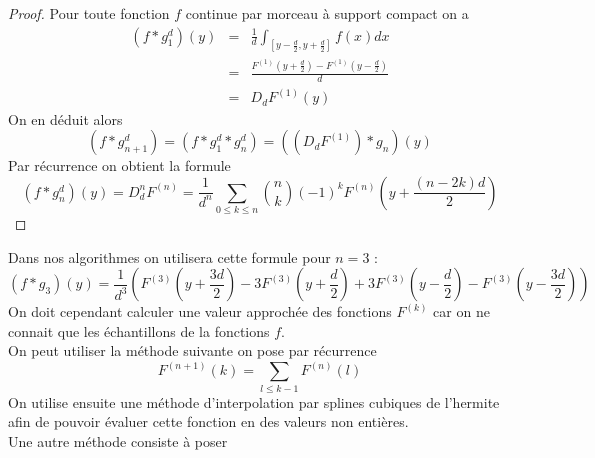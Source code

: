 \begin{proof}
Pour toute fonction $f$ continue par morceau à support compact on a 
\begin{eqnarray*}
(f * g_1^d )(y)&=&\frac{1}{d} \int_{[y-\frac{d}{2},y+\frac{d}{2}]} f(x) dx\\
               &=&\frac{F^{(1)}(y+\frac{d}{2})-F^{(1)}(y-\frac{d}{2})}{d}\\
               &=&D_d F^{(1)}(y)
\end{eqnarray*}
On en déduit alors 
\begin{equation*}
(f*g_{n+1}^{d})=(f*g_1^d * g_{n}^{d})= ((D_d F^{(1)})*g_n )(y)
\end{equation*}
Par récurrence on obtient la formule 
\begin{equation*}
(f*g_n^d)(y)=D_d ^n F^{(n)}= \frac{1}{d^n}\underset{0 \le k\le n}{\sum} \binom{n}{k}(-1)^{k} F^{(n)}(y+\frac{(n-2k)d}{2})
\end{equation*}

\end{proof}
Dans nos algorithmes  on utilisera cette formule pour $n=3$ :
\begin{equation*}
(f*g_3)(y)=\frac{1}{d^3}(F^{(3)}(y+\frac{3d}{2})-3F^{(3)}(y+\frac{d}{2})+3F^{(3)}(y-\frac{d}{2})-F^{(3)}(y-\frac{3d}{2}))
\end{equation*}
On doit cependant calculer une valeur approchée des fonctions $F^{(k)}$  car on ne connait que les échantillons de la fonctions $f$.\\
On peut utiliser la méthode suivante on pose par récurrence
\begin{equation*}
F^{(n+1)}(k)=\underset{l\le k-1}{\sum}F^{(n)}(l)
\end{equation*}
On utilise ensuite une méthode d'interpolation par splines cubiques de l'hermite afin de pouvoir évaluer cette fonction en des valeurs non entières.\\
Une autre méthode consiste à poser 

